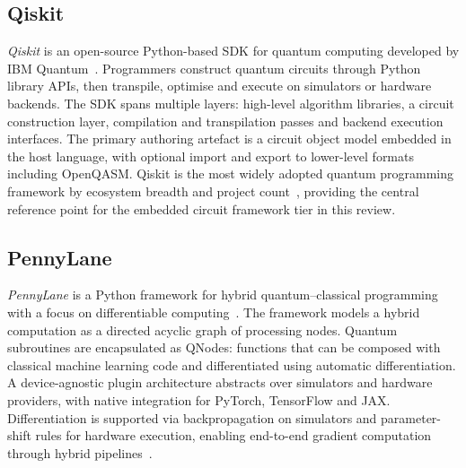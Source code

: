 \subsection{Qiskit}\label{subsec:pub_qpl_review:language_descriptions:qiskit}
\textit{Qiskit} is an open-source Python-based SDK for quantum computing developed by IBM Quantum~\cite{aleksandrowicz2019qiskit}.
Programmers construct quantum circuits through Python library APIs, then transpile, optimise and execute on simulators or hardware backends.
The SDK spans multiple layers: high-level algorithm libraries, a circuit construction layer, compilation and transpilation passes and backend execution interfaces.
The primary authoring artefact is a circuit object model embedded in the host language, with optional import and export to lower-level formats including OpenQASM.
Qiskit is the most widely adopted quantum programming framework by ecosystem breadth and project count~\cite{murillo2022sequantumprogramming,corralesgarro2025productivityexpressiveness}, providing the central reference point for the embedded circuit framework tier in this review.

\subsection{PennyLane}\label{subsec:pub_qpl_review:language_descriptions:pennylane}
\textit{PennyLane} is a Python framework for hybrid quantum--classical programming with a focus on differentiable computing~\cite{bergholm2018pennylane}.
The framework models a hybrid computation as a directed acyclic graph of processing nodes.
Quantum subroutines are encapsulated as QNodes: functions that can be composed with classical machine learning code and differentiated using automatic differentiation.
A device-agnostic plugin architecture abstracts over simulators and hardware providers, with native integration for PyTorch, TensorFlow and JAX.
Differentiation is supported via backpropagation on simulators and parameter-shift rules for hardware execution, enabling end-to-end gradient computation through hybrid pipelines~\cite{bergholm2018pennylane}.

